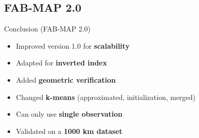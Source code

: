 \subsection{FAB-MAP 2.0}
\begin{frame}{Conclusion (FAB-MAP 2.0)}
    \begin{itemize}
        \item Improved version 1.0 for \textbf{scalability}
        \item Adapted for \textbf{inverted index}
        \item Added \textbf{geometric verification}
        \item Changed \textbf{k-means} (approximated, initialization, merged)
        \item Can only use \textbf{single observation}
        \item Validated on a \textbf{1000 km dataset}
    \end{itemize}
\end{frame}
